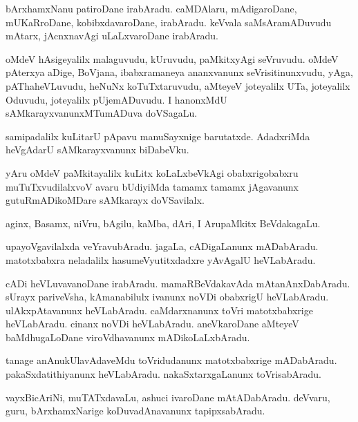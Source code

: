 \documentclass{article}
\begin{document}
\begin{mn}
bArxhamxNanu patiroDane irabAradu. caMDAlaru, mAdigaroDane, mUKaRroDane, kobibxdavaroDane, 
irabAradu. keVvala saMsAramADuvudu mAtarx, jAcnxnavAgi uLaLxvaroDane irabAradu.
\end{mn}

\begin{mn}
oMdeV hAsigeyalilx malaguvudu, kUruvudu, paMkitxyAgi seVruvudu. oMdeV pAterxya aDige, BoVjana, 
ibabxramaneya ananxvanunx seVrisitinunxvudu, yAga, pAThaheVLuvudu, heNuNx koTuTxtaruvudu, aMteyeV 
joteyalilx UTa, joteyalilx Oduvudu, joteyalilx pUjemADuvudu. I hanonxMdU sAMkarayxvanunxMTumADuva 
doVSagaLu.
\end{mn}

\begin{mn}
samipadalilx kuLitarU pApavu manuSayxnige barutatxde.  AdadxriMda heVgAdarU sAMkarayxvanunx 
biDabeVku.
\end{mn}

\begin{mn}
yAru oMdeV paMkitayalilx kuLitx koLaLxbeVkAgi obabxrigobabxru muTuTxvudilalxvoV avaru bUdiyiMda 
tamamx tamamx jAgavanunx gutuRmADikoMDare sAMkarayx doVSavilalx.
\end{mn}

\begin{mn}
aginx, Basamx, niVru, bAgilu, kaMba, dAri, I  ArupaMkitx BeVdakagaLu.
\end{mn}

\begin{mn}
upayoVgavilalxda veYravubAradu. jagaLa, cADigaLanunx mADabAradu. matotxbabxra neladalilx 
hasumeVyutitxdadxre yAvAgalU heVLabAradu. 
\end{mn}

\begin{mn}
cADi heVLuvavanoDane irabAradu. mamaRBeVdakavAda mAtanAnxDabAradu. sUrayx pariveVsha, 
kAmanabilulx ivanunx noVDi obabxrigU heVLabAradu. ulAkxpAtavanunx heVLabAradu.
caMdarxnanunx toVri matotxbabxrige heVLabAradu. cinanx 
noVDi heVLabAradu. aneVkaroDane aMteyeV baMdhugaLoDane viroVdhavanunx mADikoLaLxbAradu.
\end{mn}

\begin{mn}
tanage anAnukUlavAdaveMdu toVridudanunx matotxbabxrige mADabAradu. pakaSxdatithiyanunx  
heVLabAradu. nakaSxtarxgaLanunx toVrisabAradu.
\end{mn}

\begin{mn}
vayxBicAriNi, muTATxdavaLu, ashuci ivaroDane mAtADabAradu. deVvaru, guru, bArxhamxNarige 
koDuvadAnavanunx tapipxsabAradu.
\end{mn}
\end{document}
